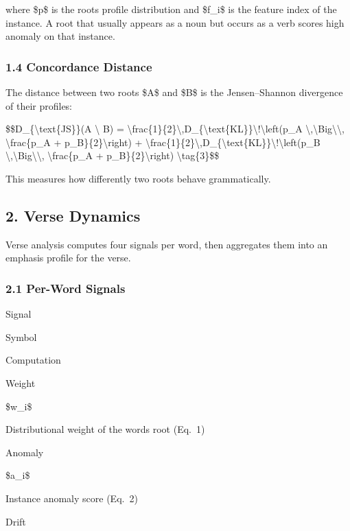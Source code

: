 \documentclass[12pt,a4paper]{article}
\begin{document}
where \$p\$ is the root\textquotesingle s profile distribution and
\$f\_i\$ is the feature index of the instance. A root that usually
appears as a noun but occurs as a verb scores high anomaly on that
instance.

\subsubsection{1.4 Concordance Distance}\label{concordance-distance}

The distance between two roots \$A\$ and \$B\$ is the Jensen--Shannon
divergence of their profiles:

\$\$D\_\{\textbackslash text\{JS\}\}(A \textbackslash\textbar{} B) =
\textbackslash frac\{1\}\{2\}\textbackslash,D\_\{\textbackslash text\{KL\}\}\textbackslash!\textbackslash left(p\_A
\textbackslash,\textbackslash Big\textbackslash\textbar\textbackslash,
\textbackslash frac\{p\_A + p\_B\}\{2\}\textbackslash right) +
\textbackslash frac\{1\}\{2\}\textbackslash,D\_\{\textbackslash text\{KL\}\}\textbackslash!\textbackslash left(p\_B
\textbackslash,\textbackslash Big\textbackslash\textbar\textbackslash,
\textbackslash frac\{p\_A + p\_B\}\{2\}\textbackslash right)
\textbackslash tag\{3\}\$\$

This measures how differently two roots behave grammatically.

\subsection{2. Verse Dynamics}\label{verse-dynamics}

Verse analysis computes four signals per word, then aggregates them into
an emphasis profile for the verse.

\subsubsection{2.1 Per-Word Signals}\label{per-word-signals}

Signal

Symbol

Computation

Weight

\$w\_i\$

Distributional weight of the word\textquotesingle s root (Eq.~1)

Anomaly

\$a\_i\$

Instance anomaly score (Eq.~2)

Drift
\end{document}
